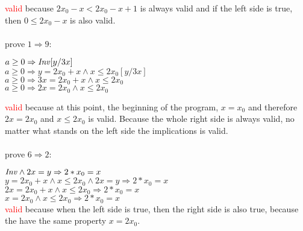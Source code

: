 \documentclass[a4paper]{scrartcl}
\begin{document}
\textcolor{red}{valid} because $2x_0 - x < 2x_0 - x + 1$ is always valid and if the left side is true, then $0 \leq 2x_0 - x$ is also valid.\\
\\
prove $1 \Rightarrow 9$:\\
\begin{center}
$a\geq0 \Rightarrow \mathit{Inv}[y/3x]$\\
$a\geq0 \Rightarrow y = 2x_0 + x \land x \leq 2x_0[y/3x]$\\
$a\geq0 \Rightarrow 3x = 2x_0 + x \land x \leq 2x_0$\\
$a\geq0 \Rightarrow 2x = 2x_0 \land x \leq 2x_0$\\
\end{center} 
\textcolor{red}{valid} because at this point, the beginning of the program, $x = x_0$ and therefore $2x = 2x_0$ and $x \leq 2x_0$ is valid.
Because the whole right side is always valid, no matter what stands on the left side the implications is valid.\\
\\
prove $6 \Rightarrow 2$:\\
\begin{center}
$\mathit{Inv} \land 2x = y \Rightarrow 2*x_0 = x$\\
$y = 2x_0 + x \land x \leq 2x_0 \land 2x = y \Rightarrow 2*x_0 = x$\\
$2x = 2x_0 + x \land x \leq 2x_0 \Rightarrow 2*x_0 = x$\\
$x = 2x_0 \land x \leq 2x_0 \Rightarrow 2*x_0 = x$\\
\textcolor{red}{valid} because when the left side is true, then the right side is also true, because the have the same property $x = 2x_0$.
\end{center} 
\end{document}
